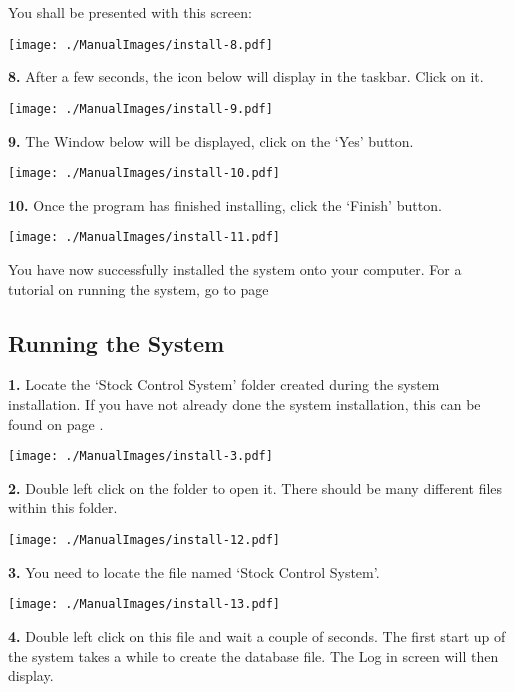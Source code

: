 \pagebreak

You shall be presented with this screen:

\texttt{[image: ./ManualImages/install-8.pdf]}

\pagebreak

\textbf{8.} After a few seconds, the icon below will display in the taskbar. Click on it.

\texttt{[image: ./ManualImages/install-9.pdf]}

\pagebreak

\textbf{9.} The Window below will be displayed, click on the `Yes' button.

\texttt{[image: ./ManualImages/install-10.pdf]}

\pagebreak

\textbf{10.} Once the program has finished installing, click the `Finish' button.

\texttt{[image: ./ManualImages/install-11.pdf]}

You have now successfully installed the system onto your computer. For a tutorial on running the system, go to page \pageref{fig:Running the System}

\pagebreak

\subsection{Running the System}
\label{fig:Running the System}

\textbf{1.} Locate the `Stock Control System' folder created during the system installation. If you have not already done the system installation, this can be found on page \pageref{fig:System Installation}.

\texttt{[image: ./ManualImages/install-3.pdf]}

\textbf{2.} Double left click on the folder to open it. There should be many different files within this folder.

\texttt{[image: ./ManualImages/install-12.pdf]}

\textbf{3.} You need to locate the file named `Stock Control System'.

\texttt{[image: ./ManualImages/install-13.pdf]}

\textbf{4.} Double left click on this file and wait a couple of seconds. The first start up of the system takes a while to create the database file. The Log in screen will then display.

